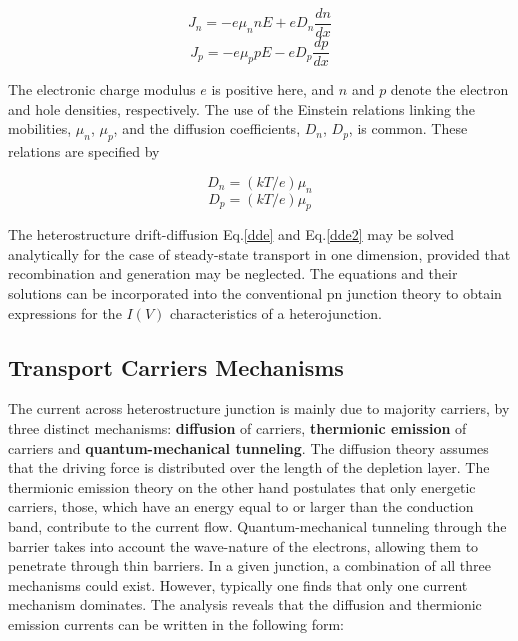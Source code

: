 \documentclass[%
reprint,
amsmath,amssymb,
aps,
]{revtex4-1}
\begin{document}
\begin{equation}
	J_n =-e \mu_n n E + eD_n \dfrac{dn}{dx}
		\label{dde}
\end{equation}
\begin{equation}
		J_p =-e \mu_p p E -  eD_p \dfrac{dp}{dx}
		\label{dde2}
\end{equation}
	
The electronic charge modulus $ e $ is positive here, and $ n $ and $ p $ denote the electron and hole densities, respectively. The use of the Einstein relations linking the mobilities, $ \mu_n $, $ \mu_p $, and the diffusion coefficients, $ D_n $, $ D_p $, is common. These relations are specified by
	
\begin{equation}
		D_n = (kT/e)\mu_n
\end{equation}
\begin{equation}
		D_p = (kT/e)\mu_p
\end{equation}
	
The heterostructure drift-diffusion Eq.\ref{dde} and Eq.\ref{dde2} may be solved analytically for the case of steady-state transport in one dimension, provided that recombination and generation may be neglected. The equations and their solutions can be incorporated into the conventional pn junction theory to obtain expressions for the $ I(V ) $ characteristics of a heterojunction.
	
	\subsection{Transport Carriers Mechanisms}
	The current across heterostructure junction is mainly due to majority carriers, by three distinct mechanisms: \textbf{diffusion} of carriers, \textbf{thermionic emission} of carriers and \textbf{quantum-mechanical tunneling}. The diffusion theory assumes that the driving force is distributed over the length of the depletion layer. The thermionic emission theory on the other hand postulates that only energetic carriers, those, which have an energy equal to or larger than the conduction band, contribute to the current flow. Quantum-mechanical tunneling through the barrier takes into account the wave-nature of the electrons, allowing them to penetrate through thin barriers. In a given junction, a combination of all three mechanisms could exist. However, typically one finds that only one current mechanism dominates.
	The analysis reveals that the diffusion and thermionic emission currents can be written in the following form:
	
\end{document}
